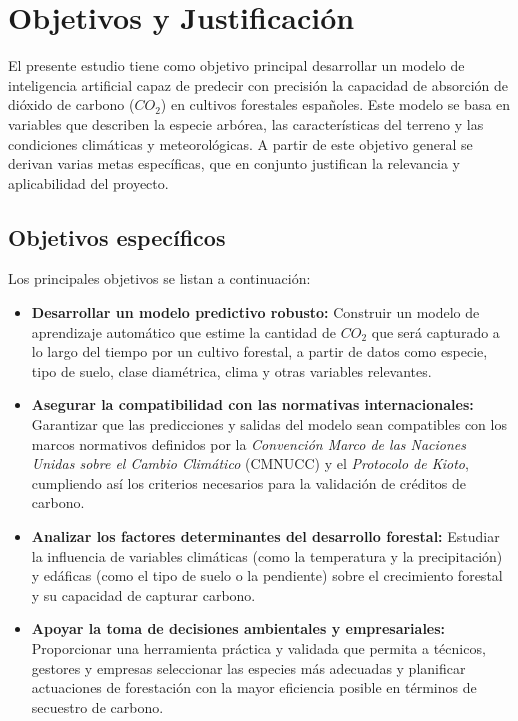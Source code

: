 \section{Objetivos y Justificación}

El presente estudio tiene como objetivo principal desarrollar un modelo de inteligencia artificial capaz de predecir con precisión la capacidad de absorción de dióxido de carbono (\(CO_2\)) en cultivos forestales españoles. Este modelo se basa en variables que describen la especie arbórea, las características del terreno y las condiciones climáticas y meteorológicas. A partir de este objetivo general se derivan varias metas específicas, que en conjunto justifican la relevancia y aplicabilidad del proyecto.

\subsection{Objetivos específicos}

Los principales objetivos se listan a continuación:

\begin{itemize}
    \item \textbf{Desarrollar un modelo predictivo robusto:} Construir un modelo de aprendizaje automático que estime la cantidad de \(CO_2\) que será capturado a lo largo del tiempo por un cultivo forestal, a partir de datos como especie, tipo de suelo, clase diamétrica, clima y otras variables relevantes.


    \item \textbf{Asegurar la compatibilidad con las normativas internacionales:} Garantizar que las predicciones y salidas del modelo sean compatibles con los marcos normativos definidos por la \textit{Convención Marco de las Naciones Unidas sobre el Cambio Climático} (CMNUCC) y el \textit{Protocolo de Kioto}, cumpliendo así los criterios necesarios para la validación de créditos de carbono.

    \item \textbf{Analizar los factores determinantes del desarrollo forestal:} Estudiar la influencia de variables climáticas (como la temperatura y la precipitación) y edáficas (como el tipo de suelo o la pendiente) sobre el crecimiento forestal y su capacidad de capturar carbono.

    \item \textbf{Apoyar la toma de decisiones ambientales y empresariales:} Proporcionar una herramienta práctica y validada que permita a técnicos, gestores y empresas seleccionar las especies más adecuadas y planificar actuaciones de forestación con la mayor eficiencia posible en términos de secuestro de carbono.
\end{itemize}

